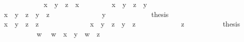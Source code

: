 \begin{isabellebody}
\ \ \ \ \isamarkupfalse%
\isanewline
\ \ \ \ \ \ \isamarkupfalse%
\ {\isachardoublequoteopen}x\ {\isasymsqinter}\ {\isacharparenleft}y\ {\isasymsqinter}\ z{\isacharparenright}\ {\isasymsqsubseteq}\ x{\isachardoublequoteclose}\ \isacommand{{\isachardot}{\isachardot}}\isamarkupfalse%
\isanewline
\ \ \ \ \ \ \isamarkupfalse%
\ {\isachardoublequoteopen}x\ {\isasymsqinter}\ {\isacharparenleft}y\ {\isasymsqinter}\ z{\isacharparenright}\ {\isasymsqsubseteq}\ y{\isachardoublequoteclose}\isanewline
\ \ \ \ \ \ \isamarkupfalse%
\ {\isacharminus}\isanewline
\ \ \ \ \ \ \ \ \isamarkupfalse%
\ {\isachardoublequoteopen}x\ {\isasymsqinter}\ {\isacharparenleft}y\ {\isasymsqinter}\ z{\isacharparenright}\ {\isasymsqsubseteq}\ y\ {\isasymsqinter}\ z{\isachardoublequoteclose}\ \isacommand{{\isachardot}{\isachardot}}\isamarkupfalse%
\isanewline
\ \ \ \ \ \ \ \ \isamarkupfalse%
\ \isamarkupfalse%
\ {\isachardoublequoteopen}{\isasymdots}\ {\isasymsqsubseteq}\ y{\isachardoublequoteclose}\ \isacommand{{\isachardot}{\isachardot}}\isamarkupfalse%
\isanewline
\ \ \ \ \ \ \ \ \isamarkupfalse%
\ \isamarkupfalse%
\ {\isacharquery}thesis\ \isacommand{{\isachardot}}\isamarkupfalse%
\isanewline
\ \ \ \ \ \ \isamarkupfalse%
\isanewline
\ \ \ \ \isamarkupfalse%
\isanewline
\ \ \ \ \isamarkupfalse%
\ {\isachardoublequoteopen}x\ {\isasymsqinter}\ {\isacharparenleft}y\ {\isasymsqinter}\ z{\isacharparenright}\ {\isasymsqsubseteq}\ z{\isachardoublequoteclose}\isanewline
\ \ \ \ \isamarkupfalse%
\ {\isacharminus}\isanewline
\ \ \ \ \ \ \isamarkupfalse%
\ {\isachardoublequoteopen}x\ {\isasymsqinter}\ {\isacharparenleft}y\ {\isasymsqinter}\ z{\isacharparenright}\ {\isasymsqsubseteq}\ y\ {\isasymsqinter}\ z{\isachardoublequoteclose}\ \isacommand{{\isachardot}{\isachardot}}\isamarkupfalse%
\isanewline
\ \ \ \ \ \ \isamarkupfalse%
\ \isamarkupfalse%
\ {\isachardoublequoteopen}{\isasymdots}\ {\isasymsqsubseteq}\ z{\isachardoublequoteclose}\ \isacommand{{\isachardot}{\isachardot}}\isamarkupfalse%
\isanewline
\ \ \ \ \ \ \isamarkupfalse%
\ \isamarkupfalse%
\ {\isacharquery}thesis\ \isacommand{{\isachardot}}\isamarkupfalse%
\isanewline
\ \ \ \ \isamarkupfalse%
\isanewline
\ \ \ \ \isamarkupfalse%
\ w\ \isamarkupfalse%
\ {\isachardoublequoteopen}w\ {\isasymsqsubseteq}\ x\ {\isasymsqinter}\ y{\isachardoublequoteclose}\ \ {\isachardoublequoteopen}w\ {\isasymsqsubseteq}\ z{\isachardoublequoteclose}\isanewline

\end{isabellebody}
